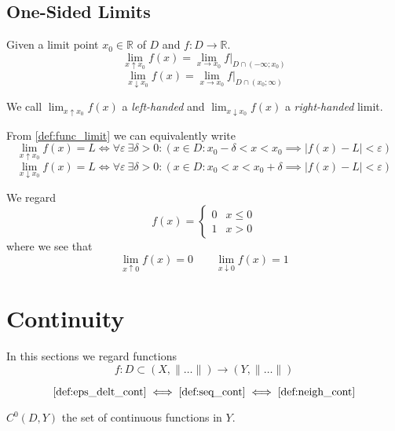 \subsection{One-Sided Limits}
\begin{definition}\label{def:one-sided_limit}
   Given a limit point \(x_0 \in \mathbb{R}\) of \(D\) and \(f: D \to \mathbb{R}\).
   \[\lim_{x \uparrow x_0}f(x) = \lim_{x \to x_0} f|_{D \cap (-\infty; x_0)}\]
   \[\lim_{x \downarrow x_0}f(x) = \lim_{x \to x_0} f|_{D \cap (x_0; \infty)}\]
\end{definition}
\begin{remark}[Terminology]
   We call \(\lim_{x \uparrow x_0} f(x)\) a \emph{left-handed} and \(\lim_{x \downarrow x_0} f(x)\) a \emph{right-handed} limit.
\end{remark}
\begin{remark}
   From \cref{def:func_limit} we can equivalently write
   \[\lim_{x \uparrow x_0} f(x) = L \iff \forall \varepsilon~\exists \delta > 0: (x \in D: x_0- \delta < x < x_0 \implies |f(x) - L| < \varepsilon)\]
   \[\lim_{x \downarrow x_0} f(x) = L \iff \forall \varepsilon~\exists \delta > 0: (x \in D: x_0 < x < x_0 + \delta \implies |f(x) - L| < \varepsilon)\]
\end{remark}
\begin{example}
   We regard
   \[f(x) = \begin{cases}0 & x \leq 0\\ 1 & x > 0\end{cases}\]
   where we see that
   \[\lim_{x \uparrow 0} f(x) = 0 \qquad \lim_{x \downarrow 0} f(x) = 1\]
\end{example}
\begin{center}
   
\end{center}

\newpage

\section{Continuity}
In this sections we regard functions
\[f: D \subset (X, \|\ldots\|) \to (Y, \|\ldots\|)\]

\begin{theorem}
   \[\text{\cref{def:eps_delt_cont}} \iff \text{\cref{def:seq_cont}} \iff \text{\cref{def:neigh_cont}}\]
\end{theorem}

\begin{definition}
   \(C^0(D, Y)\) the set of continuous functions in \(Y\).
\end{definition}

